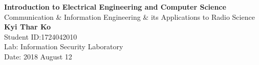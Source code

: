 \begin{titlepage}
	\begin{center}
	\vspace*{1cm}
	\Huge
	\textbf{Introduction to Electrical Engineering and Computer Science}
	\\
	\vspace{3cm}
	\Large
	Communication \& Information Engineering \& its Applications to Radio Science\\
	\vspace{1.5cm}
	\textbf{Kyi Thar Ko}\\
	Student ID:1724042010\\
	Lab: Information Security Laboratory\\
	Date: 2018 August 12\\
	\end{center}
\end{titlepage}